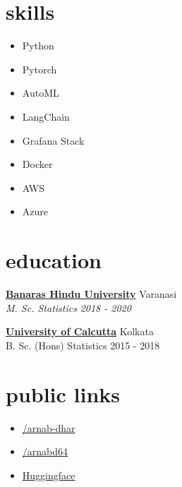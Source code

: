 \documentclass[12pt]{article}
\newcommand{\entry}[4]{{{\textbf{#1}}} \hfill #3 \\ #2 \hfill #4}
\begin{document}
\begin{paracol}{2}


\switchcolumn

\section{skills}
\begin{itemize}[itemsep=1pt,label={\faCode}]
  \item Python
  \item Pytorch
  \item AutoML
  \item LangChain
  \item Grafana Stack
  \item Docker
  \item AWS
  \item Azure
\end{itemize}


\switchcolumn
\section{education}

\entry{\href{https://www.bhu.ac.in/Site/Home/1_2_16_Main-Site}{Banaras Hindu University}}{\emph{M. Sc. Statistics}}{Varanasi}{\emph{2018 - 2020}}

\medskip

\entry{\href{https://caluniv.ac.in/}{University of Calcutta}}{B. Sc. (Hons) Statistics}{Kolkata}{2015 - 2018}

\switchcolumn
\section{public links}

\begin{itemize}[itemsep=1pt]
  \item[\faLinkedin] \href{https://www.linkedin.com/in/arnab-dhar}{/arnab-dhar}
  \item[\faGithub] \href{https://www.github.com/arnabd64}{/arnabd64} 
  \item[\faLink] \href{https://hf.co/arnabdhar}{Huggingface} 
\end{itemize}


\end{paracol}
\end{document}
